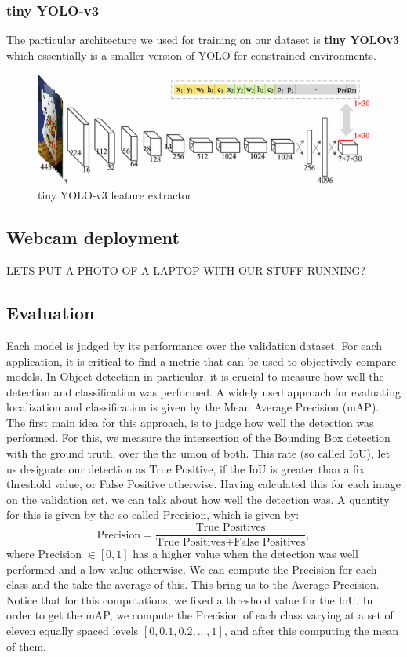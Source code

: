 \documentclass[a4paper]{article}
\begin{document}
\subsubsection*{tiny YOLO-v3}

The particular architecture we used for training on our dataset is \textbf{tiny YOLOv3} which essentially is a smaller version of YOLO for constrained environments.
\begin{figure}


\includegraphics[width=1\linewidth]{tinyyolo}
\caption{tiny YOLO-v3 feature extractor}
\end{figure}

\subsection{Webcam deployment}
LETS PUT A PHOTO OF A LAPTOP WITH OUR STUFF RUNNING?
\subsection{Evaluation}
Each model is judged by its performance over the validation dataset. For each application, it is critical to find a metric that can be used to objectively compare models.
In Object detection in particular, it is crucial to measure how well the detection and classification was performed.  
A widely used approach for evaluating localization and classification is given by the Mean Average Precision (mAP).  \\
The first main idea for this approach, is to judge how well the detection was performed.  For this, we measure the intersection of the Bounding Box detection with the ground truth, over the the union of both.  This rate (so called IoU), let us designate our detection as True Positive, if the IoU is greater than a fix threshold value, or False Positive otherwise.
Having calculated this for each image on the validation set, we can talk about how well the detection was.  A quantity for this is given by the so called Precision, which is given by:
\[\text{Precision} = \frac{\text{True Positives}}{\text{True Positives}+\text{False Positives}}, \]
where Precision $\in [0,1]$ has a higher value when the detection was well performed and a low value otherwise.
We can compute the Precision for each class and the take the average of this.  This bring us to the Average Precision. \\
Notice that for this computations, we fixed a threshold value for the IoU.   In order to get the mAP, we compute the Precision of each class varying at a set of eleven equally spaced levels 
$[0, 0.1, 0.2, ... , 1]$, and after this computing the mean of them. 
\end{document}
